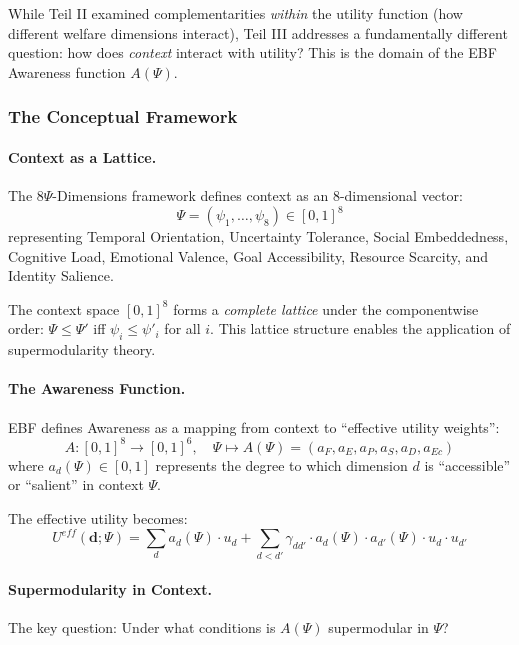 While Teil II examined complementarities \emph{within} the utility function (how 
different welfare dimensions interact), Teil III addresses a fundamentally different 
question: how does \emph{context} interact with utility? This is the domain of the 
EBF Awareness function $A(\Psi)$.

\subsubsection{The Conceptual Framework}

\paragraph{Context as a Lattice.}
The 8$\Psi$-Dimensions framework defines context as an 8-dimensional vector:
\begin{equation}
\Psi = (\psi_1, \ldots, \psi_8) \in [0,1]^8
\end{equation}
representing Temporal Orientation, Uncertainty Tolerance, Social Embeddedness, 
Cognitive Load, Emotional Valence, Goal Accessibility, Resource Scarcity, and 
Identity Salience.

The context space $[0,1]^8$ forms a \emph{complete lattice} under the componentwise 
order: $\Psi \leq \Psi'$ iff $\psi_i \leq \psi'_i$ for all $i$. This lattice 
structure enables the application of supermodularity theory.

\paragraph{The Awareness Function.}
EBF defines Awareness as a mapping from context to ``effective utility weights'':
\begin{equation}
A: [0,1]^8 \to [0,1]^6, \quad \Psi \mapsto A(\Psi) = (a_F, a_E, a_P, a_S, a_D, a_{Ec})
\end{equation}
where $a_d(\Psi) \in [0,1]$ represents the degree to which dimension $d$ is 
``accessible'' or ``salient'' in context $\Psi$.

The effective utility becomes:
\begin{equation}
U^{eff}(\mathbf{d}; \Psi) = \sum_d a_d(\Psi) \cdot u_d + 
\sum_{d < d'} \gamma_{dd'} \cdot a_d(\Psi) \cdot a_{d'}(\Psi) \cdot u_d \cdot u_{d'}
\end{equation}

\paragraph{Supermodularity in Context.}
The key question: Under what conditions is $A(\Psi)$ supermodular in $\Psi$?

